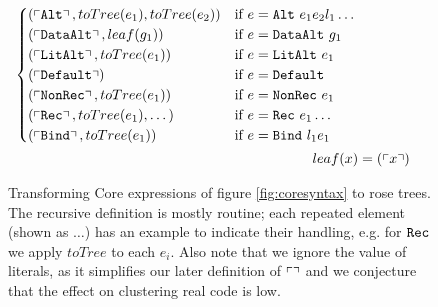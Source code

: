 \begin{figure}
\begin{align*}
\begin{cases}
      (\left\ulcorner \texttt{Alt} \right\urcorner,     toTree(e_1), toTree(e_2))                   & \text{if $e = \texttt{Alt}\ e_1 e_2 l_1 \dots$}  \\
      (\left\ulcorner \texttt{DataAlt} \right\urcorner, leaf(g_1))                                  & \text{if $e = \texttt{DataAlt}\ g_1$}  \\
      (\left\ulcorner \texttt{LitAlt} \right\urcorner,  toTree(e_1))                                & \text{if $e = \texttt{LitAlt}\ e_1$}  \\
      (\left\ulcorner \texttt{Default} \right\urcorner)                                             & \text{if $e = \texttt{Default}$}  \\
      (\left\ulcorner \texttt{NonRec} \right\urcorner,  toTree(e_1))                                & \text{if $e = \texttt{NonRec}\ e_1$}  \\
      (\left\ulcorner \texttt{Rec} \right\urcorner,     toTree(e_1), \dots)                         & \text{if $e = \texttt{Rec}\ e_1 \dots$} \\
      (\left\ulcorner \texttt{Bind} \right\urcorner,    toTree(e_1))                                & \text{if $e = \texttt{Bind}\ l_1 e_1$}
    \end{cases} \\
    leaf(x) &= (\left\ulcorner x \right\urcorner)
  \end{align*}
  \caption{Transforming Core expressions of figure \ref{fig:coresyntax} to rose trees. The recursive definition is mostly routine; each repeated element (shown as $\dots$) has an example to indicate their handling, e.g. for $\texttt{Rec}$ we apply $toTree$ to each $e_i$. Also note that we ignore the value of literals, as it simplifies our later definition of $\left\ulcorner  \right\urcorner$ and we conjecture that the effect on clustering real code is low.}
  \label{fig:totree}
\end{figure}

